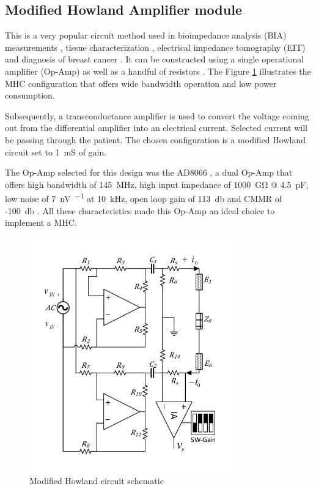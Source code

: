\subsection{Modified Howland Amplifier module}
\label{section MHC}
This is a very popular circuit method used in bioimpedance analysis (BIA) measurements \cite{aroom2009bioimpedance}, tissue characterization \cite{bertemes2002tissue,ross2003current}, electrical impedance tomography (EIT) and diagnosis of breast cancer \cite{zou2003review,saulnier2007electrical}. It can be constructed using a single operational amplifier (Op-Amp) as well as a handful of resistors \cite{sheingold1964impedance}. The Figure \ref{fig:mhc} illustrates the MHC configuration that offers wide bandwidth operation and low power consumption. 

Subsequently, a transconductance amplifier is used to convert the voltage coming out from the differential amplifier into an electrical current. Selected current will be passing through the patient. The chosen configuration is a modified Howland circuit set to \SI{1}{\milli\siemens} of gain.

The Op-Amp selected for this design was the AD8066 \cite{ad:AD8066}, a dual Op-Amp that offers high bandwidth of \SI{145}{\mega\hertz}, high input impedance of \SI{1000}{\giga\ohm} @ \SI{4.5}{\pF}, low noise of \SI{7}{\nano\volt\per{}} at \SI{10}{\kilo\hertz}, open loop gain of \SI{113}{\decibel} and CMMR of -\SI{100}{\decibel} \cite{ad:AD8066}. All these characteristics made this Op-Amp an ideal choice to implement a MHC.

\begin{figure}[!htpb]
	\centering
	\includegraphics[width=9cm,keepaspectratio]{figure3}  
	\caption{Modified Howland circuit schematic}
	\label{fig:mhc}
\end{figure}

